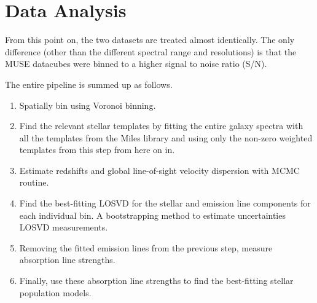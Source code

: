 \section{Data Analysis}
	\label{sec:analysis}
	From this point on, the two datasets are treated almost identically. The only difference (other than the different spectral range and resolutions) is that the MUSE datacubes were binned to a higher signal to noise ratio (S/N).

	The entire pipeline is summed up as follows.
	\begin{enumerate}
		\item Spatially bin using Voronoi binning.
		\item Find the relevant stellar templates by fitting the entire galaxy spectra with all the templates from the Miles library and using only the non-zero weighted templates from this step from here on in.
		\item Estimate redshifts and global line-of-sight velocity dispersion with MCMC routine. 
		\item Find the best-fitting LOSVD for the stellar and emission line components for each individual bin. A bootstrapping method to estimate uncertainties LOSVD measurements. 
		\item Removing the fitted emission lines from the previous step, measure absorption line strengths. 
		\item Finally, use these absorption line strengths to find the best-fitting stellar population models.
	\end{enumerate}


